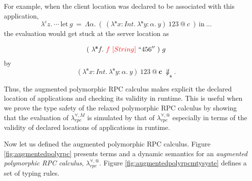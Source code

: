 \documentclass[a4paper]{article}
\makeatletter
\theoremstyle{plain}
\theoremstyle{definition}
\newcommand{\polyrpcM}{$\lambda_{rpc}^{\forall,M}$\xspace}
\newcommand{\polyrpcA}{$\lambda_{rpc}^{\forall,@}$\xspace}
\newcommand{\client}{\textbf{c}}
\newcommand{\server}{\textbf{s}}
\newcommand{\at}[1]{@#1}
\makeatother
\begin{document}
%
For example, when the client location was declared to be associated
with this application,
\[
\lambda^c z. \ \cdots \ \mbox{let} \  g \ = \ \Lambda\alpha. \ ( \  (\lambda^\server x:Int. \ \lambda^\server y:\alpha. \ y) \ 123 \ \at{\ c} \ ) \ \mbox{in} \ ...
\]
the evaluation would get stuck at the server location as

\[
\ ( \ \lambda^\server f. \ {\color{red} f \ [String]} \ ``456'' \ ) \ g \
\]
by
\[
(\lambda^\server x:Int. \ \lambda^\server y:\alpha. \ y) \ 123 \ \at{\ \client} \ \not\Downarrow_\server.
\]

%
Thus, the augmented polymorphic RPC calculus makes explicit the
declared location of applications and checking its validity in
runtime.
%
This is useful when we prove the type safety of the relaxed
polymorphic RPC calculus by showing that the evaluation of \polyrpcM
is simulated by that of \polyrpcA especially in terms of the validity
of declared locations of applications in runtime.

%
Now let us defined the augmented polymorphic RPC calculus.
%
Figure \ref{fig:augmentedpolyrpc} presents terms and a dynamic semantics for
an {\it augmented polymorphic RPC calculus}, \polyrpcA.
%
Figure \ref{fig:augmentedpolyrpcmtysyste} defines a set of typing rules.






\end{document}
